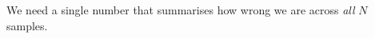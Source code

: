 \documentclass[preview]{standalone}
\begin{document}
\begin{center}
We need a single number that summarises how wrong we are across \textit{all} $N$ samples.
\end{center}
\end{document}
